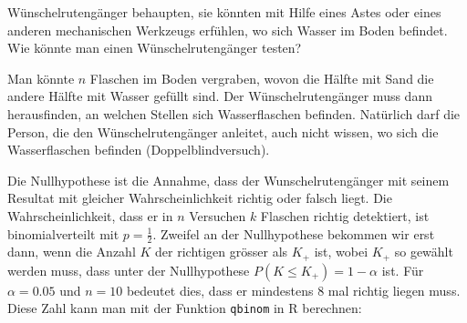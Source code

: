 Wünschelrutengänger behaupten, sie könnten mit Hilfe eines Astes
oder eines anderen mechanischen Werkzeugs erfühlen, wo sich Wasser
im Boden befindet. Wie könnte man einen Wünschelrutengänger testen?


\begin{loesung}
Man könnte $n$ Flaschen im Boden vergraben, wovon die Hälfte
mit Sand die andere Hälfte mit Wasser gefüllt sind.
Der Wünschelrutengänger muss dann herausfinden, an welchen Stellen
sich Wasserflaschen befinden.
Natürlich darf die Person, die den
Wünschelrutengänger anleitet, auch nicht wissen, wo sich die
Wasserflaschen befinden (Doppelblindversuch).

Die Nullhypothese ist die Annahme, dass der Wunschelrutengänger mit
seinem Resultat mit
gleicher Wahrscheinlichkeit richtig oder falsch liegt.
Die Wahrscheinlichkeit, dass er  in $n$ Versuchen
$k$ Flaschen richtig detektiert, ist
binomialverteilt mit $p=\frac12$.
Zweifel an der Nullhypothese bekommen wir erst
dann, wenn die Anzahl $K$ der richtigen grösser als $K_+$ ist, wobei
$K_+$ so gewählt werden muss, dass unter der Nullhypothese
$P(K\le K_+)=1-\alpha$ ist. Für $\alpha=0.05$ und $n=10$ bedeutet
dies, dass er mindestens 8 mal richtig liegen muss. Diese Zahl
kann man mit der Funktion {\tt qbinom} in R berechnen:
\end{loesung}

